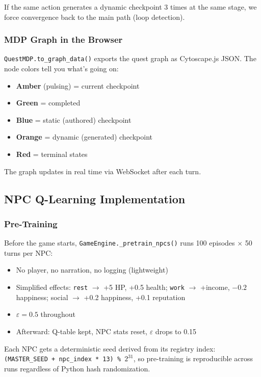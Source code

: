 If the same action generates a dynamic checkpoint 3 times at the same stage, we force convergence back to the main path (loop detection).

\subsubsection{MDP Graph in the Browser}

\texttt{QuestMDP.to\_graph\_data()} exports the quest graph as Cytoscape.js JSON. The node colors tell you what's going on:
\begin{itemize}
    \item \textbf{Amber} (pulsing) = current checkpoint
    \item \textbf{Green} = completed
    \item \textbf{Blue} = static (authored) checkpoint
    \item \textbf{Orange} = dynamic (generated) checkpoint
    \item \textbf{Red} = terminal states
\end{itemize}

The graph updates in real time via WebSocket after each turn.

\subsection{NPC Q-Learning Implementation}

\subsubsection{Pre-Training}

Before the game starts, \texttt{GameEngine.\_pretrain\_npcs()} runs 100 episodes $\times$ 50 turns per NPC:
\begin{itemize}
    \item No player, no narration, no logging (lightweight)
    \item Simplified effects: \texttt{rest} $\to$ +5 HP, +0.5 health; \texttt{work} $\to$ +income, $-0.2$ happiness; social $\to$ +0.2 happiness, +0.1 reputation
    \item $\varepsilon = 0.5$ throughout
    \item Afterward: Q-table kept, NPC stats reset, $\varepsilon$ drops to 0.15
\end{itemize}

Each NPC gets a deterministic seed derived from its registry index: \texttt{(MASTER\_SEED + npc\_index * 13) \% $2^{31}$}, so pre-training is reproducible across runs regardless of Python hash randomization.

